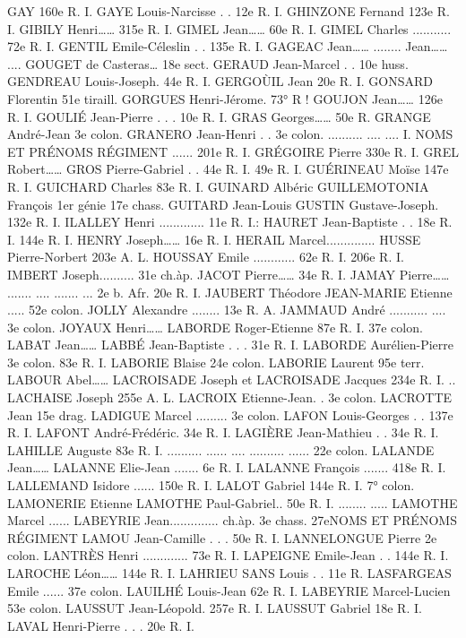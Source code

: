 \documentclass[a4paper,11pt]{book}
\begin{document}
GAY
160e R. I.
GAYE Louis-Narcisse . . 12e R. I.
GHINZONE Fernand
123e R. I.
GIBILY Henri……
315e R. I.
GIMEL Jean……
60e R. I.
GIMEL Charles ........... 72e R. I.
GENTIL Emile-Céleslin . . 135e R. I.
GAGEAC Jean……
........
Jean……
....
GOUGET de Casteras… 18e sect.
GERAUD Jean-Marcel . . 10e huss.
GENDREAU Louis-Joseph. 44e R. I.
GERGOÙIL Jean
20e R. I.
GONSARD Florentin
51e tiraill.
GORGUES Henri-Jérome. 73° R !
GOUJON Jean……
126e R. I.
GOULIÉ Jean-Pierre . . . 10e R. I.
GRAS Georges……
50e R.
GRANGE André-Jean
3e colon.
GRANERO Jean-Henri . . 3e colon.
..........
....
....
I.
NOMS ET PRÉNOMS
RÉGIMENT
......
201e R. I.
GRÉGOIRE Pierre
330e R. I.
GREL Robert……
GROS Pierre-Gabriel . . 44e R. I.
49e R. I.
GUÉRINEAU Moïse
147e R. I.
GUICHARD Charles
83e R. I.
GUINARD Albéric
GUILLEMOTONIA François 1er génie
17e chass.
GUITARD Jean-Louis
GUSTIN Gustave-Joseph. 132e R. I.
ILALLEY Henri ............. 11e R. I.:
HAURET Jean-Baptiste . . 18e R. I.
144e R. I.
HENRY Joseph……
16e R. I.
HERAIL Marcel..............
HUSSE Pierre-Norbert 203e A. L.
HOUSSAY Emile ............ 62e R. I.
206e R. I.
IMBERT Joseph..........
31e ch.àp.
JACOT Pierre……
34e R. I.
JAMAY Pierre……
.......
....
.......
...
2e b. Afr.
20e R. I.
JAUBERT Théodore
JEAN-MARIE Etienne ..... 52e colon.
JOLLY Alexandre ........ 13e R. A.
JAMMAUD André ...........
....
3e colon.
JOYAUX Henri……
LABORDE Roger-Etienne 87e R. I.
37e colon.
LABAT Jean……
LABBÉ Jean-Baptiste . . . 31e R. I.
LABORDE Aurélien-Pierre 3e colon.
83e R. I.
LABORIE Blaise
24e colon.
LABORIE Laurent
95e terr.
LABOUR Abel……
LACROISADE Joseph et
LACROISADE Jacques
234e R. I.
..
LACHAISE Joseph
255e A. L.
LACROIX Etienne-Jean. . 3e colon.
LACROTTE Jean
15e drag.
LADIGUE Marcel .........
3e colon.
LAFON Louis-Georges . . 137e R. I.
LAFONT André-Frédéric. 34e R. I.
LAGIÈRE Jean-Mathieu . . 34e R. I.
LAHILLE Auguste
83e R. I.
..........
......
....
..........
......
22e colon.
LALANDE Jean……
LALANNE Elie-Jean ....... 6e R. I.
LALANNE François ....... 418e R. I.
LALLEMAND Isidore
......
150e R. I.
LALOT Gabriel
144e R. I.
7° colon.
LAMONERIE Etienne
LAMOTHE Paul-Gabriel.. 50e R. I.
........
.....
LAMOTHE Marcel ......
LABEYRIE Jean..............
ch.àp.
3e chass.
27eNOMS ET PRÉNOMS
RÉGIMENT
LAMOU Jean-Camille . . . 50e R. I.
LANNELONGUE Pierre
2e colon.
LANTRÈS Henri ............. 73e R. I.
LAPEIGNE Emile-Jean . . 144e R. I.
LAROCHE Léon……
144e R. I.
LAHRIEU SANS Louis . . 11e R.
LASFARGEAS Emile ...... 37e colon.
LAUILHÉ Louis-Jean
62e R. I.
LABEYRIE Marcel-Lucien 53e colon.
LAUSSUT Jean-Léopold. 257e R. I.
LAUSSUT Gabriel
18e R. I.
LAVAL Henri-Pierre . . . 20e R. I.
\end{document}
